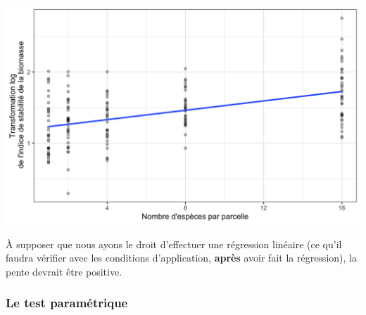 \documentclass[a4paperpaper,]{article}
\newenvironment{Shaded}{\begin{snugshade}}{\end{snugshade}}
\newcommand{\CharTok}[1]{\textcolor[rgb]{0.57,0.30,0.62}{#1}}
\newcommand{\DataTypeTok}[1]{\textcolor[rgb]{0.00,0.34,0.68}{#1}}
\newcommand{\FloatTok}[1]{\textcolor[rgb]{0.69,0.50,0.00}{#1}}
\newcommand{\KeywordTok}[1]{\textcolor[rgb]{0.12,0.11,0.11}{\textbf{#1}}}
\newcommand{\NormalTok}[1]{\textcolor[rgb]{0.12,0.11,0.11}{#1}}
\newcommand{\OperatorTok}[1]{\textcolor[rgb]{0.12,0.11,0.11}{#1}}
\newcommand{\OtherTok}[1]{\textcolor[rgb]{0.00,0.43,0.16}{#1}}
\newcommand{\StringTok}[1]{\textcolor[rgb]{0.75,0.01,0.01}{#1}}
\begin{document}
\begin{Shaded}
\end{Shaded}

\begin{center}\includegraphics[width=0.9\linewidth]{figure/unnamed-chunk-117-1} \end{center}

À supposer que nous ayons le droit d'effectuer une régression linéaire (ce qu'il faudra vérifier avec les conditions d'application, \textbf{après} avoir fait la régression), la pente devrait être positive.

\hypertarget{le-test-paramuxe9trique-5}{%
\subsubsection{Le test paramétrique}\label{le-test-paramuxe9trique-5}}
\end{document}
